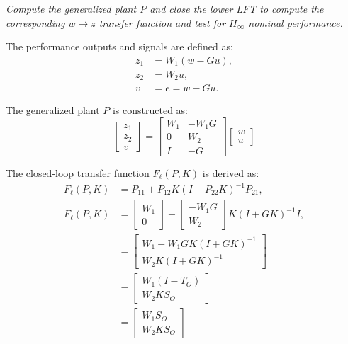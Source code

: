 \documentclass{article}
\begin{document}
\textit{Compute the generalized plant $P$ and close the lower LFT to compute the corresponding $w \to z$ transfer function and test for $H_\infty$ nominal performance.}

The performance outputs and signals are defined as:
\[
\begin{aligned}
z_1 &= W_1 (w - Gu), \\
z_2 &= W_2 u, \\
v &= e = w - Gu.
\end{aligned}
\]

The generalized plant $P$ is constructed as:
\[
\begin{bmatrix}
z_1 \\
z_2 \\
v
\end{bmatrix}
=
\begin{bmatrix}
W_1 & -W_1 G \\
0 & W_2 \\
I & -G
\end{bmatrix}
\begin{bmatrix}
w \\
u
\end{bmatrix}
\]

The closed-loop transfer function $F_\ell(P, K)$ is derived as:
\[
\begin{aligned}
F_\ell(P, K) &= P_{11} + P_{12} K (I - P_{22} K)^{-1} P_{21}, \\
F_\ell(P, K) &= \begin{bmatrix}
W_1 \\
0
\end{bmatrix}
+ \begin{bmatrix}
-W_1 G \\
W_2
\end{bmatrix}
K (I + G K)^{-1} I, \\
&= \begin{bmatrix}
W_1-W_1 G K (I + G K)^{-1} \\
W_2 K (I + G K)^{-1}
\end{bmatrix} \\
&= \begin{bmatrix}
W_1 (I - T_O) \\
W_2 K S_O
\end{bmatrix} \\
&= \begin{bmatrix}
W_1 S_O \\
W_2 K S_O
\end{bmatrix}
\end{aligned}
\]
\end{document}
